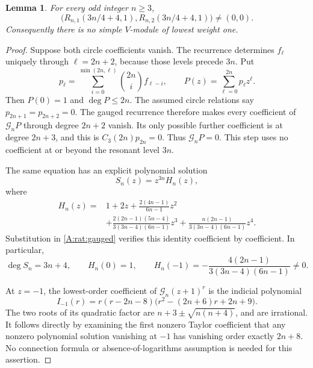 \documentclass[11pt]{article}
\newtheorem{lemma}[theorem]{Lemma}
\numberwithin{equation}{section}
\begin{document}
\begin{lemma}\label{A:rat:twocircle}
For every odd integer $n\geq3$,
\[
 \bigl(R_{n,1}(3n/4+4,1),R_{n,2}(3n/4+4,1)\bigr)\ne(0,0).
\]
Consequently there is no simple $V$-module of lowest weight one.
\end{lemma}
\begin{proof}
Suppose both circle coefficients vanish. The recurrence determines $f_\ell$ uniquely through $\ell=2n+2$, because those levels precede $3n$. Put
\[
 p_\ell=\sum_{i=0}^{\min(2n,\ell)}\binom{2n}{i}f_{\ell-i},
 \qquad P(z)=\sum_{\ell=0}^{2n}p_\ell z^\ell.
\]
Then $P(0)=1$ and $\deg P\leq2n$. The assumed circle relations say $p_{2n+1}=p_{2n+2}=0$. The gauged recurrence therefore makes every coefficient of $\mathcal G_nP$ through degree $2n+2$ vanish. Its only possible further coefficient is at degree $2n+3$, and this is $C_3(2n)p_{2n}=0$. Thus $\mathcal G_nP=0$. This step uses no coefficient at or beyond the resonant level $3n$.

The same equation has an explicit polynomial solution
\begin{equation}\label{A:rat:highsol}
 S_n(z)=z^{3n}H_n(z),
\end{equation}
where
\begin{equation}\label{A:rat:Hpoly}
 \begin{split}
 H_n(z)={}&1+2z+\frac{2(4n-1)}{6n-1}z^2\\
 &+\frac{2(2n-1)(5n-4)}{3(3n-4)(6n-1)}z^3
   +\frac{n(2n-1)}{3(3n-4)(6n-1)}z^4.
 \end{split}
\end{equation}
Substitution in \eqref{A:rat:gauged} verifies this identity coefficient by coefficient. In particular,
\begin{equation}\label{A:rat:Hminusone}
 \deg S_n=3n+4,\qquad H_n(0)=1,\qquad
 H_n(-1)=-\frac{4(2n-1)}{3(3n-4)(6n-1)}\ne0.
\end{equation}

At $z=-1$, the lowest-order coefficient of $\mathcal G_n(z+1)^r$ is the indicial polynomial
\begin{equation}\label{A:rat:indminusone}
 I_{-1}(r)=r(r-2n-8)\bigl(r^2-(2n+6)r+2n+9\bigr).
\end{equation}
The two roots of its quadratic factor are $n+3\pm\sqrt{n(n+4)}$, and are irrational. It follows directly by examining the first nonzero Taylor coefficient that any nonzero polynomial solution vanishing at $-1$ has vanishing order exactly $2n+8$. No connection formula or absence-of-logarithms assumption is needed for this assertion.


\end{proof}
\end{document}
